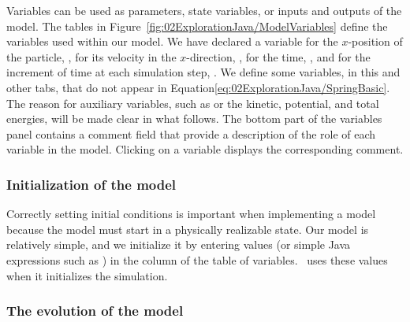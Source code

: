 Variables can be used as parameters,  state variables, or inputs and outputs of the model.  The tables in Figure~\ref{fig:02ExplorationJava/ModelVariables} define the variables used within our model.  We have
declared a variable for the $x$-position of the particle, , for its velocity in the
$x$-direction, , for the time, , and for the increment of time at each simulation step, .
We define some variables, in this and other tabs, that do not appear in Equation\eqref{eq:02ExplorationJava/SpringBasic}. The reason for auxiliary variables, such as   or the kinetic, potential, and total energies, will be made clear in what follows. The bottom part of the variables panel contains a comment field that provide a description of the role of each variable in the model. Clicking on a variable displays the corresponding comment.

\subsubsection{Initialization of the model}
Correctly setting initial conditions is important when implementing a model because the model must start in a
physically realizable state. Our model is relatively simple, and we initialize it by entering values (or simple Java
expressions such as ) in the  column of the table of variables. \ejs\ uses these values when it initializes the simulation.


\subsubsection{The evolution of the model}

